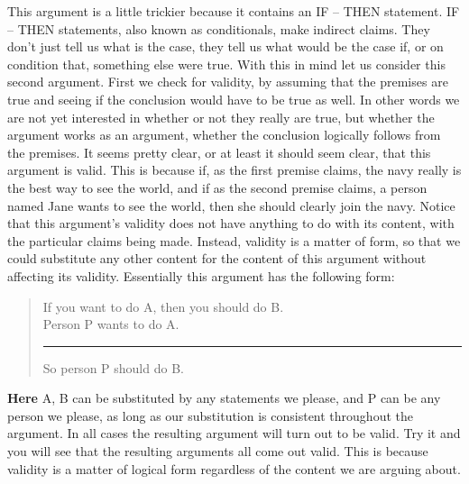 \documentclass[]{book}
\newenvironment{argument}{\begin{quote}\normalsize}{\end{quote}}
\begin{document}
This argument is a little trickier because it contains an IF -- THEN statement. IF -- THEN statements, also known as conditionals, make indirect claims. They don't just tell us what is the case, they tell us what would be the case if, or on condition that, something else were true. With this in mind let us consider this second argument. First we check for validity, by assuming that the premises are true and seeing if the conclusion would have to be true as well. In other words we are not yet interested in whether or not they really are true, but whether the argument works as an argument, whether the conclusion logically follows from the premises. It seems pretty clear, or at least it should seem clear, that this argument is valid. This is because if, as the first premise claims, the navy really is the best way to see the world, and if as the second premise claims, a person named Jane wants to see the world, then she should clearly join the navy. Notice that this argument's validity does not have anything to do with its content, with the particular claims being made. Instead, validity is a matter of form, so that we could substitute any other content for the content of this argument without affecting its validity. Essentially this argument has the following form:

\begin{argument}
If you want to do A, then you should do B.\\
Person P wants to do A.\\

\begin{center}\rule{0.5\linewidth}{\linethickness}\end{center}

So person P should do B.
\end{argument}

\textbf{Here} A, B can be substituted by any statements we please, and P can be any person we please, as long as our substitution is consistent throughout the argument. In all cases the resulting argument will turn out to be valid. Try it and you will see that the resulting arguments all come out valid. This is because validity is a matter of logical form regardless of the content we are arguing about.
\end{document}
